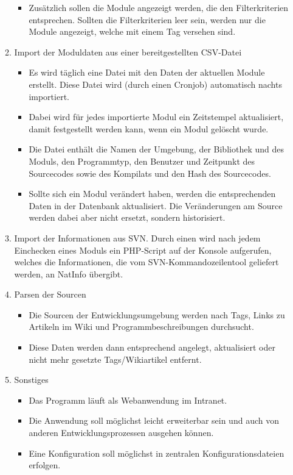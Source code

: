 \begin{enumerate}[itemsep=0em,partopsep=0em,parsep=0em,topsep=0em]
\begin{enumerate}
\begin{itemize}
		\item Zusätzlich sollen die Module angezeigt werden, die den Filterkriterien entsprechen. Sollten die Filterkriterien leer sein, werden nur die Module angezeigt, welche mit einem Tag versehen sind.
		\end{itemize}
	\item Import der Moduldaten aus einer bereitgestellten CSV-Datei
		\begin{itemize}
		\item Es wird täglich eine Datei mit den Daten der aktuellen Module erstellt. Diese Datei wird (durch einen Cronjob) automatisch nachts importiert.
		\item Dabei wird für jedes importierte Modul ein Zeitstempel aktualisiert, damit festgestellt werden kann, wenn ein Modul gelöscht wurde.
		\item Die Datei enthält die Namen der Umgebung, der Bibliothek und des Moduls, den Programmtyp, den Benutzer und Zeitpunkt des Sourcecodes sowie des Kompilats und den Hash des Sourcecodes.
		\item Sollte sich ein Modul verändert haben, werden die entsprechenden Daten in der Datenbank aktualisiert. Die Veränderungen am Source werden dabei aber nicht ersetzt, sondern historisiert.
		\end{itemize}
	\item Import der Informationen aus SVN. Durch einen  wird nach jedem Einchecken eines Moduls ein PHP-Script auf der Konsole aufgerufen, welches die Informationen, die vom SVN-Kommandozeilentool geliefert werden, an NatInfo übergibt.
	\item Parsen der Sourcen
		\begin{itemize}
		\item Die Sourcen der Entwicklungsumgebung werden nach Tags, Links zu Artikeln im Wiki und Programmbeschreibungen durchsucht.
		\item Diese Daten werden dann entsprechend angelegt, aktualisiert oder nicht mehr gesetzte Tags/Wikiartikel entfernt.
		\end{itemize}
	\item Sonstiges
		\begin{itemize}
		\item Das Programm läuft als Webanwendung im Intranet.
		\item Die Anwendung soll möglichst leicht erweiterbar sein und auch von anderen Entwicklungsprozessen ausgehen können.
		\item Eine Konfiguration soll möglichst in zentralen Konfigurationsdateien erfolgen.
		\end{itemize}
	\end{enumerate}
\end{enumerate}

